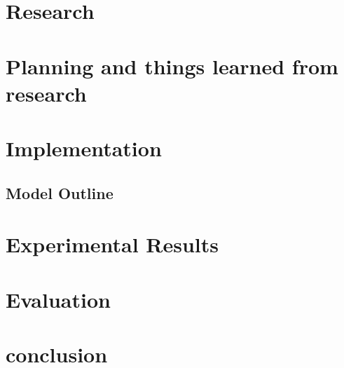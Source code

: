 \documentclass[a4paper]{l4proj}
\begin{document}
\chapter{Research}
\label{research_head}


\chapter{Planning and things learned from research}  %
\label{planning_head}

\chapter{Implementation}
\label{implementation_head}

\section{Model Outline}
\label{model_outline}


\chapter{Experimental Results}
\label{experimental_results}


\chapter{Evaluation}
\label{evaluation}


\chapter{conclusion}
\label{conclusion}

%

%
%
\end{document}
